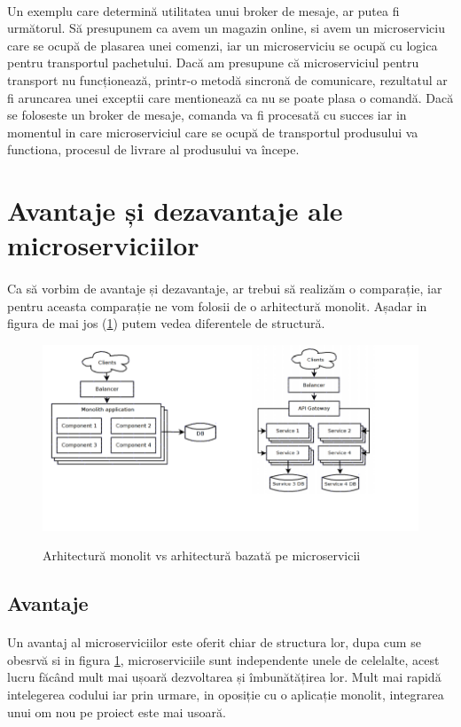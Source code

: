 \documentclass[12pt]{report}
\begin{document}
	\paragraph{}Un exemplu care determină utilitatea unui broker de mesaje, ar putea fi următorul. Să presupunem ca avem un magazin online, si avem un microserviciu care se ocupă de plasarea unei comenzi, iar un microserviciu se ocupă cu logica pentru transportul pachetului. Dacă am presupune că microserviciul pentru transport nu funcționează, printr-o metodă sincronă de comunicare, rezultatul ar fi aruncarea unei exceptii care mentionează ca nu se poate plasa o comandă. Dacă se foloseste un broker de mesaje, comanda va fi procesată cu succes iar in momentul in care microserviciul care se ocupă de transportul produsului va functiona, procesul de livrare al produsului va începe.
	\section{Avantaje și dezavantaje ale microserviciilor}
	\paragraph{}Ca să vorbim de avantaje și dezavantaje, ar trebui să realizăm o comparație, iar pentru aceasta comparație ne vom folosii de o arhitectură monolit. Așadar in figura de mai jos (\ref{movsmicr}) putem vedea diferentele de structură. 
	\begin{figure}[h]
  	\centering
  	\includegraphics[scale=1]{movsmicr}
	\caption{Arhitectură monolit vs arhitectură bazată pe microservicii}\cite{savchenko2015microservices}  
	\label{movsmicr}
  	\end{figure}
  	\subsection{Avantaje}
  	\paragraph{}Un avantaj al microserviciilor este oferit chiar de structura lor, dupa cum se obesrvă si in figura \ref{movsmicr}, microserviciile sunt independente unele de celelalte, acest lucru făcând mult mai ușoară dezvoltarea și îmbunătățirea lor. Mult mai rapidă intelegerea codului iar prin urmare, in oposiție cu o aplicație monolit, integrarea unui om nou pe proiect este mai usoară.
\end{document}
